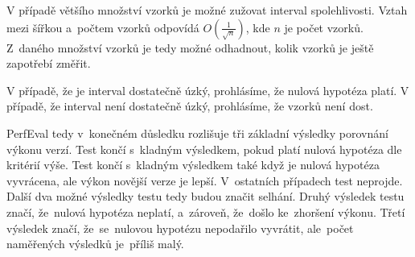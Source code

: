 V případě většího množství vzorků je možné zužovat interval spolehlivosti. Vztah mezi
šířkou a~počtem vzorků odpovídá $O(\frac{1}{\sqrt{n}})$, kde $n$ je počet vzorků. Z~daného
množství vzorků je tedy možné odhadnout, kolik vzorků je ještě zapotřebí změřit.

V případě, že je interval dostatečně úzký, prohlásíme, že nulová hypotéza platí.
V případě, že interval není dostatečně úzký, prohlásíme, že vzorků není dost.

PerfEval tedy v~konečném důsledku rozlišuje tři základní výsledky porovnání výkonu verzí.
Test končí s~kladným výsledkem, pokud platí nulová hypotéza dle kritérií výše. Test
končí s~kladným výsledkem také když je nulová hypotéza vyvrácena, ale výkon novější verze je lepší.
V~ostatních případech test neprojde. Další dva možné výsledky testu tedy budou značit selhání.
Druhý výsledek testu značí, že~nulová hypotéza neplatí, a~zároveň, že~došlo ke~zhoršení výkonu.
Třetí výsledek značí, že~se~nulovou hypotézu nepodařilo vyvrátit, ale~počet naměřených výsledků
je~příliš malý.
